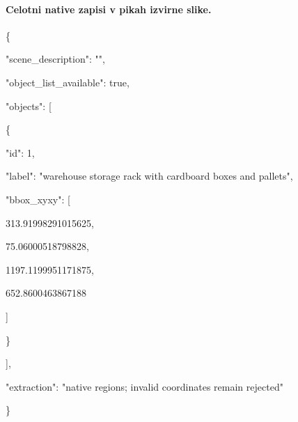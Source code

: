 \documentclass[10pt,a4paper]{article}
\begin{document}
\paragraph{Celotni native zapisi v pikah izvirne slike.}
\{\par
  "scene\_description":\allowbreak{} "",\allowbreak{}\par
  "object\_list\_available":\allowbreak{} true,\allowbreak{}\par
  "objects":\allowbreak{} [\par
    \{\par
      "id":\allowbreak{} 1,\allowbreak{}\par
      "label":\allowbreak{} "warehouse storage rack with cardboard boxes and pallets",\allowbreak{}\par
      "bbox\_xyxy":\allowbreak{} [\par
        313.91998291015625,\allowbreak{}\par
        75.06000518798828,\allowbreak{}\par
        1197.1199951171875,\allowbreak{}\par
        652.8600463867188\par
      ]\par
    \}\par
  ],\allowbreak{}\par
  "extraction":\allowbreak{} "native regions; invalid coordinates remain rejected"\par
\}
\end{document}
